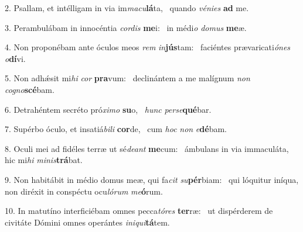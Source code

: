 2. Psallam, et intélligam in via im\textit{ma}\textit{cu}\textbf{lá}ta, \ast\  quando \textit{vé}\textit{ni}\textit{es} \textbf{ad} me.\

3. Perambulábam in innocéntia \textit{cor}\textit{dis} \textbf{me}i: \ast\  in médi\textit{o} \textit{do}\textit{mus} \textbf{me}æ.\

4. Non proponébam ante óculos meos \textit{rem} \textit{in}\textbf{jús}tam: \ast\  faciéntes prævaricati\textit{ó}\textit{nes} \textit{o}\textbf{dí}vi.\

5. Non adhǽsit mi\textit{hi} \textit{cor} \textbf{pra}vum: \ast\  declinántem a me malígnum \textit{non} \textit{co}\textit{gno}\textbf{scé}bam.\

6. Detrahéntem secréto pró\textit{xi}\textit{mo} \textbf{su}o, \ast\  \textit{hunc} \textit{per}\textit{se}\textbf{qué}bar.\

7. Supérbo óculo, et insatiá\textit{bi}\textit{li} \textbf{cor}de, \ast\  cum \textit{hoc} \textit{non} \textit{e}\textbf{dé}bam.\

8. Oculi mei ad fidéles terræ ut sé\textit{de}\textit{ant} \textbf{me}cum: \ast\  ámbulans in via immaculáta, hic mi\textit{hi} \textit{mi}\textit{nis}\textbf{trá}bat.\

9. Non habitábit in médio domus meæ, qui fa\textit{cit} \textit{su}\textbf{pér}biam: \ast\  qui lóquitur iníqua, non diréxit in conspéctu ocu\textit{ló}\textit{rum} \textit{me}\textbf{ó}rum.\

10. In matutíno interficiébam omnes pecca\textit{tó}\textit{res} \textbf{ter}ræ: \ast\  ut dispérderem de civitáte Dómini omnes operántes \textit{in}\textit{i}\textit{qui}\textbf{tá}tem.\

